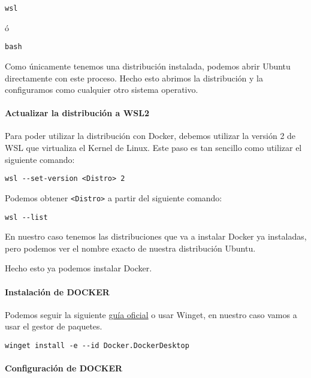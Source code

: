 \begin{verbatim}
wsl
\end{verbatim}
ó
\begin{verbatim}
bash
\end{verbatim}

Como únicamente tenemos una distribución instalada, podemos abrir Ubuntu
directamente con este proceso. Hecho esto abrimos la distribución y la
configuramos como cualquier otro sistema operativo.

\hypertarget{actualizar-la-distribuciuxf3n-a-wsl2}{%
\paragraph{Actualizar la distribución a
WSL2}\label{actualizar-la-distribuciuxf3n-a-wsl2}}

Para poder utilizar la distribución con Docker, debemos utilizar la
versión 2 de WSL que virtualiza el Kernel de Linux. Este paso es tan
sencillo como utilizar el siguiente comando:
\begin{verbatim}
wsl --set-version <Distro> 2
\end{verbatim}


Podemos obtener \texttt{\textless{}Distro\textgreater{}} a partir del
siguiente comando:

\begin{verbatim}
wsl --list  
\end{verbatim}


En nuestro caso tenemos las distribuciones que va a instalar Docker ya
instaladas, pero podemos ver el nombre exacto de nuestra distribución
Ubuntu. 

Hecho esto ya podemos instalar Docker.

\hypertarget{instalaciuxf3n-de-docker}{%
\paragraph{Instalación de DOCKER}\label{instalaciuxf3n-de-docker}}

Podemos seguir la siguiente
\href{https://docs.docker.com/desktop/windows/install/}{guía oficial} o
usar Winget, en nuestro caso vamos a usar el gestor de paquetes.

\begin{verbatim}
winget install -e --id Docker.DockerDesktop
\end{verbatim}

\hypertarget{configuraciuxf3n-de-docker}{%
\paragraph{Configuración de DOCKER}\label{configuraciuxf3n-de-docker}}

